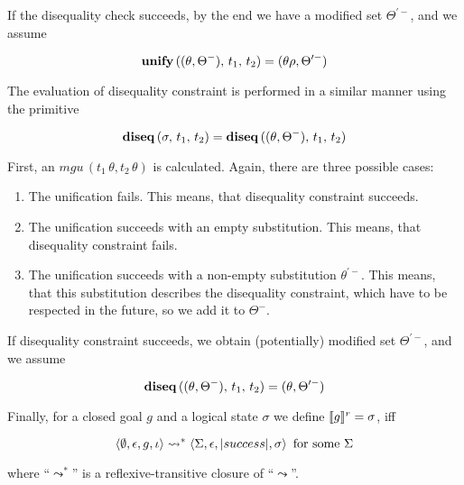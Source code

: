 If the disequality check succeeds, by the end we have a modified set $\Theta^{\prime-}$, and we assume

$$
{\bf unify}\,((\theta,\Theta^-),\,t_1,\,t_2)=(\theta\rho,\Theta^{\prime-})
$$

The evaluation of disequality constraint is performed in a similar manner using the primitive

$$
{\bf diseq}\,(\sigma,\,t_1,\,t_2)={\bf diseq}\,((\theta,\Theta^-),\,t_1,\,t_2)
$$

First, an $mgu\,(t_1\,\theta,t_2\,\theta)$ is calculated. Again, there are three
possible cases:

\begin{enumerate}
\item The unification fails. This means, that disequality constraint succeeds.
\item The unification succeeds with an empty substitution. This means, that disequality
constraint fails.
\item The unification succeeds with a non-empty substitution $\theta^{\prime-}$. This means, that 
this substitution describes the disequality constraint, which have to be respected in
the future, so we add it to $\Theta^-$. 
\end{enumerate}

If disequality constraint succeeds, we obtain (potentially) modified set $\Theta^{\prime-}$, and we
assume

$$
{\bf diseq}\,((\theta,\Theta^-),\,t_1,\,t_2)=(\theta,\Theta^{\prime-})
$$

Finally, for a closed goal $g$ and a logical state $\sigma$ we define $\llbracket{g}\rrbracket^r=\sigma$, iff

$$
\inbr{\emptyset,\epsilon,g,\iota}\leadsto^*\inbr{\Sigma,\epsilon,\lstinline|success|,\sigma}\mbox{ for some $\Sigma$}
$$
 
\noindent where ``$\leadsto^*$'' is a reflexive-transitive closure of ``$\leadsto$''. 




